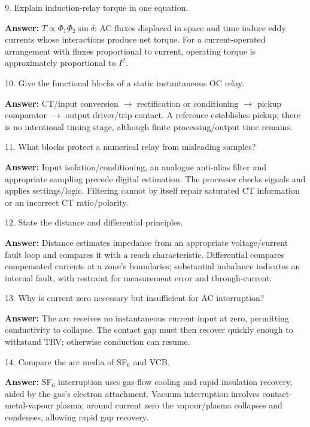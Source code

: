 \documentclass[11pt,a4paper]{article}
\newcommand{\checkq}[2]{\begin{tcolorbox}[breakable=false,colback=pale,colframe=teal,coltitle=white,title={Check your understanding}]#1\par\textbf{Answer:} #2\end{tcolorbox}}
\begin{document}
\checkq{9. Explain induction-relay torque in one equation.}{$T\propto\Phi_1\Phi_2\sin\delta$: AC fluxes displaced in space and time induce eddy currents whose interactions produce net torque. For a current-operated arrangement with fluxes proportional to current, operating torque is approximately proportional to $I^2$.}
\checkq{10. Give the functional blocks of a static instantaneous OC relay.}{CT/input conversion $\rightarrow$ rectification or conditioning $\rightarrow$ pickup comparator $\rightarrow$ output driver/trip contact. A reference establishes pickup; there is no intentional timing stage, although finite processing/output time remains.}
\checkq{11. What blocks protect a numerical relay from misleading samples?}{Input isolation/conditioning, an analogue anti-alias filter and appropriate sampling precede digital estimation. The processor checks signals and applies settings/logic. Filtering cannot by itself repair saturated CT information or an incorrect CT ratio/polarity.}
\checkq{12. State the distance and differential principles.}{Distance estimates impedance from an appropriate voltage/current fault loop and compares it with a reach characteristic. Differential compares compensated currents at a zone's boundaries; substantial imbalance indicates an internal fault, with restraint for measurement error and through-current.}
\checkq{13. Why is current zero necessary but insufficient for AC interruption?}{The arc receives no instantaneous current input at zero, permitting conductivity to collapse. The contact gap must then recover quickly enough to withstand TRV; otherwise conduction can resume.}
\checkq{14. Compare the arc media of SF$_6$ and VCB.}{SF$_6$ interruption uses gas-flow cooling and rapid insulation recovery, aided by the gas's electron attachment. Vacuum interruption involves contact-metal-vapour plasma; around current zero the vapour/plasma collapses and condenses, allowing rapid gap recovery.}
\end{document}
